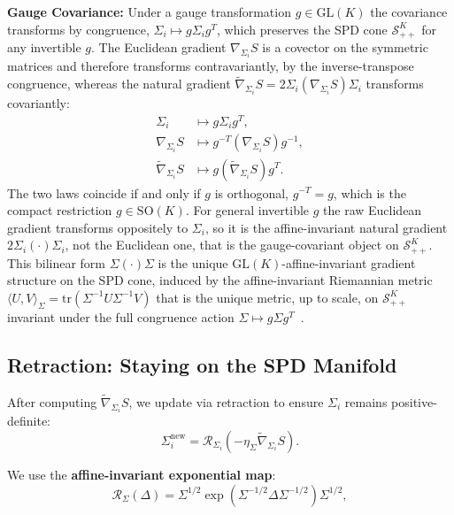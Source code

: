 \documentclass[11pt]{article}
\begin{document}
\textbf{Gauge Covariance:} Under a gauge transformation $g \in \mathrm{GL}(K)$ the covariance transforms by congruence, $\Sigma_i \mapsto g\Sigma_i g^T$, which preserves the SPD cone $\mathcal{S}_{++}^K$ for any invertible $g$. The Euclidean gradient $\nabla_{\Sigma_i} S$ is a covector on the symmetric matrices and therefore transforms contravariantly, by the inverse-transpose congruence, whereas the natural gradient $\tilde{\nabla}_{\Sigma_i} S = 2\Sigma_i(\nabla_{\Sigma_i} S)\Sigma_i$ transforms covariantly:
\begin{align}
\Sigma_i &\mapsto g\Sigma_i g^T, \\
\nabla_{\Sigma_i} S &\mapsto g^{-T}(\nabla_{\Sigma_i} S)g^{-1}, \\
\tilde{\nabla}_{\Sigma_i} S &\mapsto g(\tilde{\nabla}_{\Sigma_i} S)g^T.
\end{align}
The two laws coincide if and only if $g$ is orthogonal, $g^{-T} = g$, which is the compact restriction $g \in \mathrm{SO}(K)$. For general invertible $g$ the raw Euclidean gradient transforms oppositely to $\Sigma_i$, so it is the affine-invariant natural gradient $2\Sigma_i(\cdot)\Sigma_i$, not the Euclidean one, that is the gauge-covariant object on $\mathcal{S}_{++}^K$. This bilinear form $\Sigma(\cdot)\Sigma$ is the unique $\mathrm{GL}(K)$-affine-invariant gradient structure on the SPD cone, induced by the affine-invariant Riemannian metric $\langle U, V\rangle_\Sigma = \mathrm{tr}(\Sigma^{-1}U\Sigma^{-1}V)$ that is the unique metric, up to scale, on $\mathcal{S}_{++}^K$ invariant under the full congruence action $\Sigma \mapsto g\Sigma g^T$~\cite{Pennec2006, Amari2016, Bhatia2007}.

\subsection*{Retraction: Staying on the SPD Manifold}

After computing $\tilde{\nabla}_{\Sigma_i} S$, we update via retraction to ensure $\Sigma_i$ remains positive-definite:
\begin{equation}
\Sigma_i^{\mathrm{new}} = \mathcal{R}_{\Sigma_i}(-\eta_\Sigma \tilde{\nabla}_{\Sigma_i} S).
\end{equation}

We use the \textbf{affine-invariant exponential map}:
\begin{equation}
\mathcal{R}_{\Sigma}(\Delta) = \Sigma^{1/2} \exp\left(\Sigma^{-1/2} \Delta \Sigma^{-1/2}\right) \Sigma^{1/2},
\end{equation}
\end{document}
